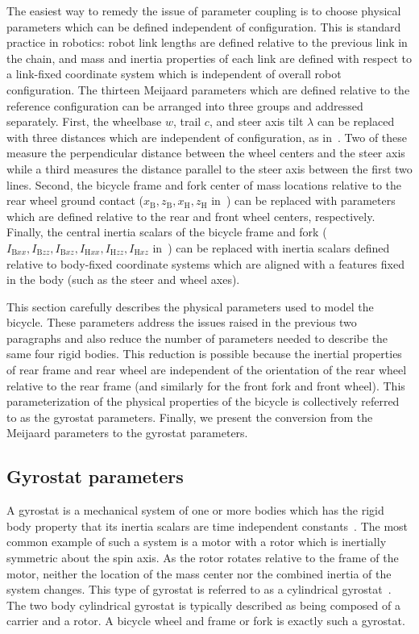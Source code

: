 The easiest way to remedy the issue of parameter coupling is to choose physical
parameters which can be defined independent of configuration. This is standard
practice in robotics: robot link lengths are defined relative to the previous
link in the chain, and mass and inertia properties of each link are defined
with respect to a link-fixed coordinate system which is independent of overall
robot configuration. The thirteen Meijaard parameters which are defined
relative to the reference configuration can be arranged into three groups and
addressed separately. First, the wheelbase $w$, trail $c$, and steer axis tilt
$\lambda$ can be replaced with three distances which are independent of
configuration, as in~\cite{Franke1990}. Two of these measure the perpendicular
distance between the wheel centers and the steer axis while a third measures
the distance parallel to the steer axis between the first two lines. Second,
the bicycle frame and fork center of mass locations relative to the rear wheel
ground contact ($x_\text{B}, z_\text{B}, x_\text{H}, z_\text{H}$
in~\cite{Meijaard2007}) can be replaced with parameters which are defined
relative to the rear and front wheel centers, respectively. Finally, the
central inertia scalars of the bicycle frame and fork ($I_{\text{B}xx},
I_{\text{B}zz}, I_{\text{B}xz}, I_{\text{H}xx}, I_{\text{H}zz}, I_{\text{H}xz}$
in~\cite{Meijaard2007}) can be replaced with inertia scalars defined relative
to body-fixed coordinate systems which are aligned with a features fixed in the
body (such as the steer and wheel axes).

This section carefully describes the physical parameters used to model the
bicycle. These parameters address the issues raised in the previous two
paragraphs and also reduce the number of parameters needed to describe the same
four rigid bodies. This reduction is possible because the inertial properties
of rear frame and rear wheel are independent of the orientation of the rear
wheel relative to the rear frame (and similarly for the front fork and front
wheel). This parameterization of the physical properties of the bicycle is
collectively referred to as the gyrostat parameters. Finally, we present the
conversion from the Meijaard parameters to the gyrostat parameters.

\subsection{Gyrostat parameters} \label{model:gyrostat_parameters}
A gyrostat is a mechanical system of one or more bodies which has the rigid
body property that its inertia scalars are time independent
constants~\cite{Wittenburg2008}. The most common example of such a system is a
motor with a rotor which is inertially symmetric about the spin axis. As the
rotor rotates relative to the frame of the motor, neither the location of the
mass center nor the combined inertia of the system changes. This type of
gyrostat is referred to as a cylindrical gyrostat~\cite{Mitiguy2001}. The two
body cylindrical gyrostat is typically described as being composed of a carrier
and a rotor. A bicycle wheel and frame or fork is exactly such a gyrostat.

